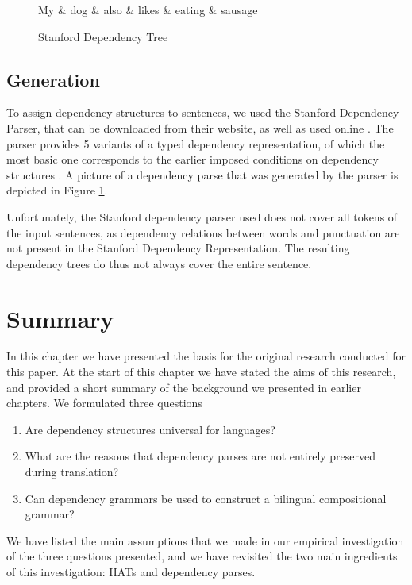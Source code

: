 \begin{figure}[!h]\label{fig:deptree1}
\centering
\begin{dependency}[theme=simple]%
\begin{deptext}[column sep=.5cm, row sep=.1ex]
My \& dog \& also \& likes \& eating \& sausage \\
\end{deptext}
\end{dependency}
\caption{Stanford Dependency Tree}\label{fig:deptree}
\end{figure}

\subsection{Generation}

To assign dependency structures to sentences, we used the Stanford Dependency Parser, that can be downloaded from their website, as well as used online  \citep{de2006generating}. The parser provides 5 variants of a typed dependency representation, of which the most basic one corresponds to the earlier imposed conditions on dependency structures \citep{de2008stanford}. A picture of a dependency parse that was generated by the parser is depicted in Figure \ref{fig:deptree}.

Unfortunately, the Stanford dependency parser used does not cover all tokens of the input sentences, as dependency relations between words and punctuation are not present in the Stanford Dependency Representation. The resulting dependency trees do thus not always cover the entire sentence.

\section{Summary}
\label{sec:summary4}

In this chapter we have presented the basis for the original research conducted for this paper. At the start of this chapter we have stated the aims of this research, and provided a short summary of the background we presented in earlier chapters. We formulated three questions\begin{enumerate}
\item Are dependency structures universal for languages?
\item What are the reasons that dependency parses are not entirely preserved during translation?
\item Can dependency grammars be used to construct a bilingual compositional grammar?
\end{enumerate}

We have listed the main assumptions that we made in our empirical investigation of the three questions presented, and we have revisited the two main ingredients of this investigation: HATs and dependency parses.
%
%
